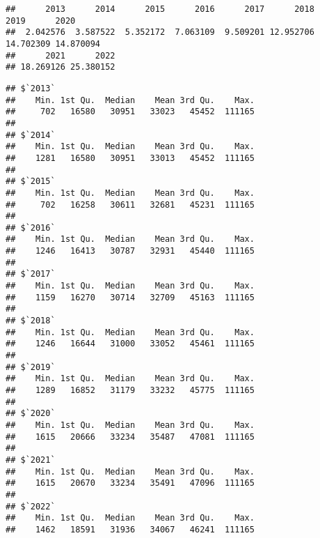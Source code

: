 \documentclass[
]{article}
\newenvironment{Shaded}{\begin{snugshade}}{\end{snugshade}}
\newcommand{\AttributeTok}[1]{\textcolor[rgb]{0.13,0.29,0.53}{#1}}
\newcommand{\ConstantTok}[1]{\textcolor[rgb]{0.56,0.35,0.01}{#1}}
\newcommand{\FunctionTok}[1]{\textcolor[rgb]{0.13,0.29,0.53}{\textbf{#1}}}
\newcommand{\NormalTok}[1]{#1}
\newcommand{\SpecialCharTok}[1]{\textcolor[rgb]{0.81,0.36,0.00}{\textbf{#1}}}
\begin{document}
\begin{Shaded}
\end{Shaded}

\begin{verbatim}
##      2013      2014      2015      2016      2017      2018      2019      2020 
##  2.042576  3.587522  5.352172  7.063109  9.509201 12.952706 14.702309 14.870094 
##      2021      2022 
## 18.269126 25.380152
\end{verbatim}

\begin{Shaded}
\end{Shaded}

\begin{verbatim}
## $`2013`
##    Min. 1st Qu.  Median    Mean 3rd Qu.    Max. 
##     702   16580   30951   33023   45452  111165 
## 
## $`2014`
##    Min. 1st Qu.  Median    Mean 3rd Qu.    Max. 
##    1281   16580   30951   33013   45452  111165 
## 
## $`2015`
##    Min. 1st Qu.  Median    Mean 3rd Qu.    Max. 
##     702   16258   30611   32681   45231  111165 
## 
## $`2016`
##    Min. 1st Qu.  Median    Mean 3rd Qu.    Max. 
##    1246   16413   30787   32931   45440  111165 
## 
## $`2017`
##    Min. 1st Qu.  Median    Mean 3rd Qu.    Max. 
##    1159   16270   30714   32709   45163  111165 
## 
## $`2018`
##    Min. 1st Qu.  Median    Mean 3rd Qu.    Max. 
##    1246   16644   31000   33052   45461  111165 
## 
## $`2019`
##    Min. 1st Qu.  Median    Mean 3rd Qu.    Max. 
##    1289   16852   31179   33232   45775  111165 
## 
## $`2020`
##    Min. 1st Qu.  Median    Mean 3rd Qu.    Max. 
##    1615   20666   33234   35487   47081  111165 
## 
## $`2021`
##    Min. 1st Qu.  Median    Mean 3rd Qu.    Max. 
##    1615   20670   33234   35491   47096  111165 
## 
## $`2022`
##    Min. 1st Qu.  Median    Mean 3rd Qu.    Max. 
##    1462   18591   31936   34067   46241  111165
\end{verbatim}
\end{document}
